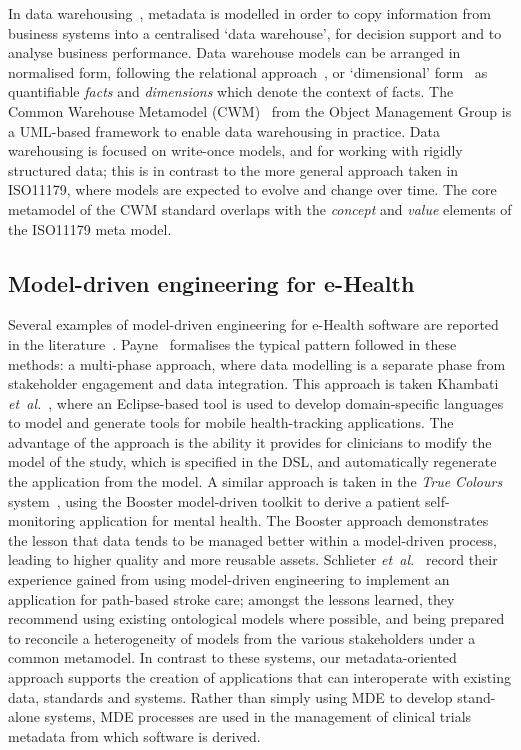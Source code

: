 \documentclass[a4paper,twoside]{article}
\begin{document}
In data warehousing~\cite{kim02}, metadata is modelled in order to copy
information from business systems into a centralised `data warehouse',
for decision support and to analyse business performance. Data
warehouse models can be arranged in normalised form, following the
relational approach~\cite{inm92}, or `dimensional' form~\cite{kim02}
as quantifiable \emph{facts} and \emph{dimensions} which denote the
context of facts. The Common Warehouse Metamodel (CWM)~\cite{poole03}
from the Object Management Group is a UML-based framework to enable
data warehousing in practice. Data warehousing is focused on
write-once models, and for working with rigidly structured data; this
is in contrast to the more general approach taken in ISO11179, where
models are expected to evolve and change over time. 
The core metamodel of the CWM standard overlaps with the 
\emph{concept} and \emph{value} elements of the ISO11179 meta model.

\subsection{Model-driven engineering for e-Health}

Several examples of model-driven engineering for e-Health software are
reported in the literature~\cite{dav14,ragh08,blob07,kham08,schl15}.
Payne~\cite{pay12} formalises the typical pattern followed in these
methods: a multi-phase approach, where data modelling is a separate
phase from stakeholder engagement and data integration. This approach
is taken Khambati \textit{et~al.}~\cite{kham08}, where an
Eclipse-based tool is used to develop domain-specific languages to
model and generate tools for mobile health-tracking applications. The
advantage of the approach is the ability it provides for clinicians to
modify the model of the study, which is specified in the DSL, and
automatically regenerate the application from the model. A similar
approach is taken in the \emph{True Colours} system~\cite{dav14},
using the Booster model-driven toolkit to derive a patient
self-monitoring application for mental health. The Booster approach
demonstrates the lesson that data tends to be managed better within a
model-driven process, leading to higher quality and more reusable
assets.  Schlieter \textit{et~al.}~\cite{schl15} record their
experience gained from using model-driven engineering to implement an
application for path-based stroke care; amongst the lessons learned,
they recommend using existing ontological models where possible, and
being prepared to reconcile a heterogeneity of models from the various
stakeholders under a common metamodel.  In contrast to these systems,
our metadata-oriented approach supports the creation of applications
that can interoperate with existing data, standards and
systems. Rather than simply using MDE to develop stand-alone systems,
MDE processes are used in the management of clinical trials metadata
from which software is derived.
\end{document}
